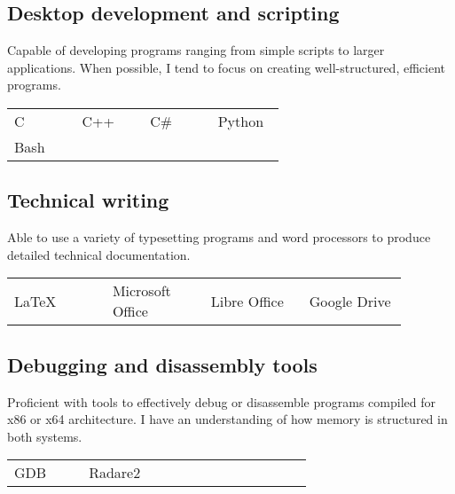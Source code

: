 \documentclass[letterpaper]{article}
\begin{document}
        \subsection*{Desktop development and scripting}

        Capable of developing programs ranging from simple scripts to larger applications.
        When possible, I tend to focus on creating well-structured, efficient programs.

        \begin{center}
        \begin{tabular}{p{0.22\linewidth} p{0.22\linewidth} p{0.22\linewidth} p{0.22\linewidth}}
            C & C++ & C\# & Python \\
            Bash &&&\\
        \end{tabular}
        \end{center}

        \subsection*{Technical writing}

        Able to use a variety of typesetting programs and word processors to produce detailed technical documentation.

        \begin{center}
        \begin{tabular}{p{0.22\linewidth} p{0.22\linewidth} p{0.22\linewidth} p{0.22\linewidth}}
            LaTeX & Microsoft Office & Libre Office & Google Drive \\
        \end{tabular}
        \end{center}

        \subsection*{Debugging and disassembly tools}
        Proficient with tools to effectively debug or disassemble programs compiled for x86 or x64 architecture.
        I have an understanding of how memory is structured in both systems.

        \begin{center}
        \begin{tabular}{p{0.22\linewidth} p{0.22\linewidth} p{0.22\linewidth} p{0.22\linewidth}}
            GDB & Radare2 &&\\
        \end{tabular}
        \end{center}
\end{document}
